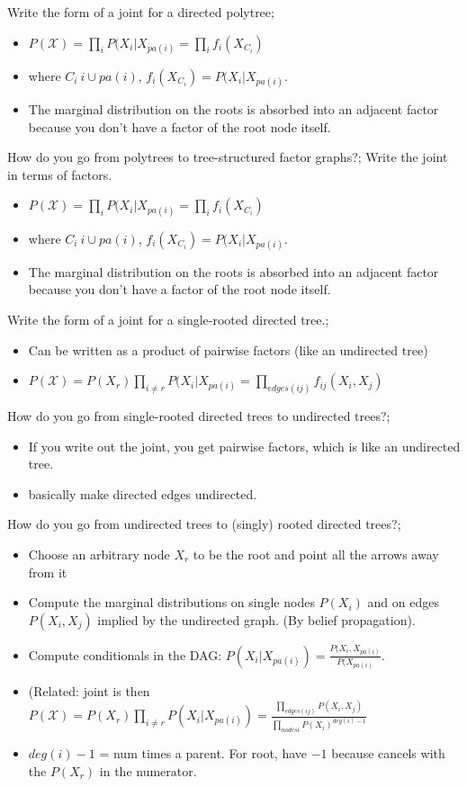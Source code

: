 \documentclass{article}
\begin{document}
Write the form of a joint for a directed polytree; \begin{itemize}
    \item $P(\mathcal{X})=\prod_i P(X_i|X_{pa(i)} = \prod_i f_i(X_{C_i})$
    \item where $C_i \ i\cup pa(i)$, $f_i(X_{C_i})=P(X_i|X_{pa(i)}$.
    \item The marginal distribution on the roots is absorbed into an adjacent factor because you don't have a factor of the root node itself.
\end{itemize}

How do you go from polytrees to tree-structured factor graphs?; Write the joint in terms of factors. \begin{itemize}
    \item $P(\mathcal{X})=\prod_i P(X_i|X_{pa(i)} = \prod_i f_i(X_{C_i})$
    \item where $C_i \ i\cup pa(i)$, $f_i(X_{C_i})=P(X_i|X_{pa(i)}$.
    \item The marginal distribution on the roots is absorbed into an adjacent factor because you don't have a factor of the root node itself.
\end{itemize}

Write the form of a joint for a single-rooted directed tree.; \begin{itemize}
    \item Can be written as a product of pairwise factors (like an undirected tree)
    \item $P(\mathcal{X})=P(X_r)\prod_{i\ne r} P(X_i|X_{pa(i)} = \prod_{edges(ij)} f_{ij}(X_{i}, X_j)$
\end{itemize}

How do you go from single-rooted directed trees to undirected trees?; \begin{itemize}
    \item If you write out the joint, you get pairwise factors, which is like an undirected tree.
    \item basically make directed edges undirected.
\end{itemize}

How do you go from undirected trees to (singly) rooted directed trees?; \begin{itemize}
    \item Choose an arbitrary node $X_r$ to be the root and point all the arrows away from it
    \item Compute the marginal distributions on single nodes $P(X_i)$ and on edges $P(X_i, X_j)$ implied by the undirected graph. (By belief propagation).
    \item Compute conditionals in the DAG: $P(X_i|X_{pa(i)}) = \frac{P(X_i, X_{pa(i)}}{P(X_{pa(i)}}$.
    \item (Related: joint is then $P(\mathcal{X})=P(X_r)\prod_{i\ne r}P(X_i|X_{pa(i)})=\frac{\prod_{edges(ij)}P(X_i, X_j)}{\prod_{nodes i}P(X_i)^{deg(i)-1}}$
    \item $deg(i) - 1$ = num times a parent. For root, have $-1$ because cancels with the $P(X_r)$ in the numerator.
\end{itemize}
\end{document}
